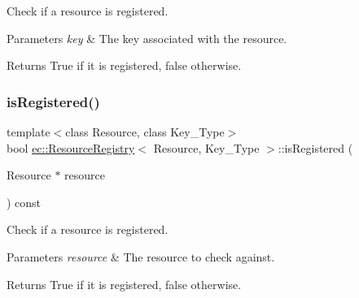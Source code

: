 Check if a resource is registered. 


\begin{DoxyParams}{Parameters}
{\em key} & The key associated with the resource. \\
\hline
\end{DoxyParams}
\begin{DoxyReturn}{Returns}
True if it is registered, false otherwise. 
\end{DoxyReturn}
\mbox{\label{classec_1_1_resource_registry_a390baad918714b91edc22670d1f72fd9}} 
\subsubsection{\texorpdfstring{is\+Registered()}{isRegistered()}\hspace{0.1cm}{\footnotesize\ttfamily [2/2]}}
{\footnotesize\ttfamily template$<$class Resource, class Key\+\_\+\+Type$>$ \\
bool \mbox{\hyperlink{classec_1_1_resource_registry}{ec\+::\+Resource\+Registry}}$<$ Resource, Key\+\_\+\+Type $>$\+::is\+Registered (\begin{DoxyParamCaption}\item[{Resource $\ast$}]{resource }\end{DoxyParamCaption}) const}



Check if a resource is registered. 


\begin{DoxyParams}{Parameters}
{\em resource} & The resource to check against. \\
\hline
\end{DoxyParams}
\begin{DoxyReturn}{Returns}
True if it is registered, false otherwise. 
\end{DoxyReturn}
\mbox{\label{classec_1_1_resource_registry_a64545efa3e392204f02ebe388b2a54a6}} 

